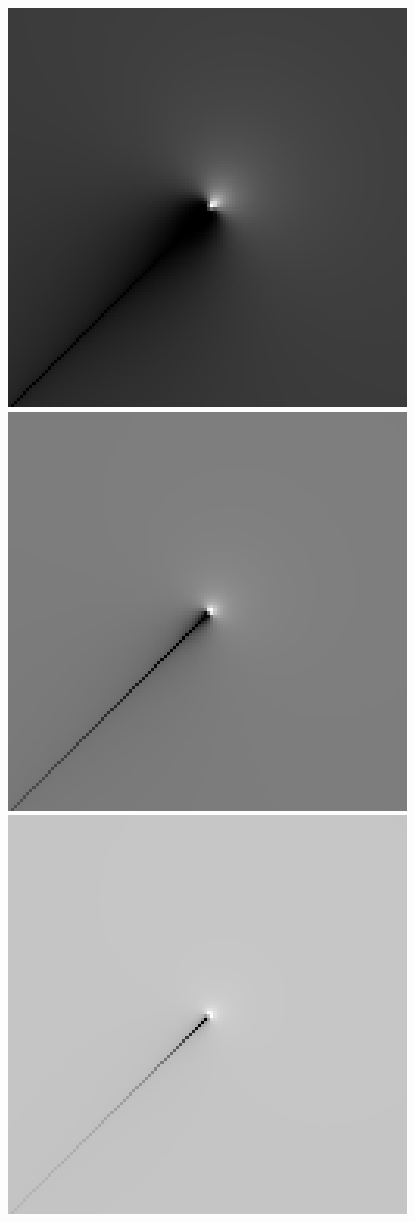 \begin{figure}
{ }
 \subbottom
 {
 \includegraphics[scale=1]{figures/dfilt_wur_sqrt8.png}
 }
 \subbottom
 {
 \includegraphics[scale=1]{figures/dfilt_wur_sqrt50.png}
 }
 \subbottom
 {
 \includegraphics[scale=1]{figures/dfilt_wur_sqrt200.png}
}
\end{figure}
